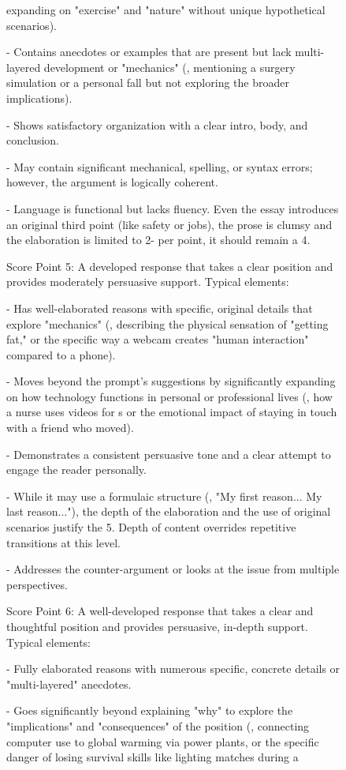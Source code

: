 \begin{figure}[t]
\begin{tcolorbox}[colback=white,colframe=black!25,title=Refined Rubric (Pattern-Highlighted),fonttitle=\bfseries\small,fontupper=\scriptsize]
expanding on "exercise" and "nature" without unique hypothetical scenarios).\par - Contains anecdotes or examples that are present but lack multi-layered development or "mechanics" (, mentioning a surgery simulation or a personal fall but not exploring the broader implications).\par - Shows satisfactory organization with a clear intro, body, and conclusion.\par - May contain significant mechanical, spelling, or syntax errors; however, the argument is logically coherent.\par - Language is functional but lacks fluency. Even  the essay introduces an original third point (like safety or jobs),  the prose is clumsy and the elaboration is limited to 2- per point, it should remain a 4.\par \par Score Point 5: A developed response that takes a clear position and provides moderately persuasive support. Typical elements:\par - Has well-elaborated reasons with specific, original details that explore "mechanics" (, describing the physical sensation of "getting fat," or the specific way a webcam creates "human interaction" compared to a phone).\par - Moves beyond the prompt's suggestions by significantly expanding on how technology functions in personal or professional lives (, how a nurse uses videos for s or the emotional impact of staying in touch with a friend who moved).\par - Demonstrates a consistent persuasive tone and a clear attempt to engage the reader personally.\par - While it may use a formulaic structure (, "My first reason... My last reason..."), the depth of the elaboration and the use of original scenarios justify the 5. Depth of content overrides repetitive transitions at this level.\par - Addresses the counter-argument or looks at the issue from multiple perspectives.\par \par Score Point 6: A well-developed response that takes a clear and thoughtful position and provides persuasive, in-depth support. Typical elements:\par - Fully elaborated reasons with numerous specific, concrete details or "multi-layered" anecdotes.\par - Goes significantly beyond explaining "why" to explore the "implications" and "consequences" of the position (, connecting computer use to global warming via power plants, or the specific danger of losing survival skills like lighting matches during a 
\end{tcolorbox}
\end{figure}

